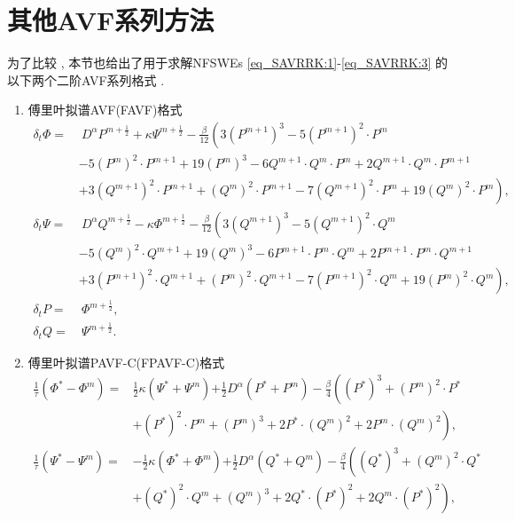 \section{其他AVF系列方法}\label{Section_PAVF: 3-1}
为了比较 , 本节也给出了用于求解NFSWEs \eqref{eq_SAVRRK:1}-\eqref{eq_SAVRRK:3} 的以下两个二阶AVF系列格式 . 
\begin{enumerate}[$\bullet$]
\item 傅里叶拟谱AVF(FAVF)格式
\begin{align}
\delta_{t} \varPhi =&~{D^{\alpha} P^{m+\frac{1}{2}}}+\kappa \Psi^{m+\frac{1}{2}}-\frac{\beta}{12}\left(3 (P^{m+1})^3-5 (P^{m+1})^2\cdot P^{m}\right . \nonumber\\
		&-5 (P^{m})^2\cdot P^{m+1}+19 (P^{m})^3-6 Q^{m+1}\cdot Q^{m}\cdot P^{m}+2 Q^{m+1}\cdot Q^{m}\cdot P^{m+1} \nonumber\\
		&+\left . 3 (Q^{m+1})^2\cdot P^{m+1}+(Q^{m})^2\cdot P^{m+1}-7 (Q^{m+1})^2\cdot P^{m}+19 (Q^{m} )^2\cdot P^{m}\right) , \label{eq_PAVF:66}\\
\delta_{t} \Psi =&~{D^{\alpha} Q^{m+\frac{1}{2}}}-\kappa \varPhi^{m+\frac{1}{2}}-\frac{\beta}{12}\left(3 (Q^{m+1})^3-5 (Q^{m+1})^2\cdot Q^{m}\right . \nonumber\\
		&-5 (Q^{m})^2\cdot Q^{m+1}+19 (Q^{m})^3-6 P^{m+1}\cdot P^{m}\cdot Q^{m}+2 P^{m+1}\cdot P^{m}\cdot Q^{m+1} \nonumber\\
		&+\left . 3 (P^{m+1})^2\cdot Q^{m+1}+(P^{m})^2\cdot Q^{m+1}-7 (P^{m+1})^2\cdot Q^{m}+19 (P^{m} )^2\cdot Q^{m}\right) , \label{eq_PAVF:67}\\
\delta_{t} P=&~\varPhi^{m+\frac{1}{2}} , \label{eq_PAVF:68}\\
\delta_{t} Q=&~\Psi^{m+\frac{1}{2}} . \label{eq_PAVF:69}
\end{align}
\item 傅里叶拟谱PAVF-C(FPAVF-C)格式
\begin{align}
\frac{1}{\tau}\left(\varPhi^{*}-\varPhi^{m}\right)=&\frac{1}{2}\kappa(\Psi^{*}+\Psi^{m}){+\frac{1}{2}D^{\alpha} (P^{*}+P^{m})}-\frac{\beta}{4}\left( (P^{*})^3+ (P^{m})^{2}\cdot P^{*}\right . \nonumber\\
		&\left . + (P^{*})^{2}\cdot P^{m}+ (P^{m})^{3}+2 P^{*}\cdot (Q^{m})^{2}+2 P^{m}\cdot (Q^{m})^{2}\right) , \label{eq_PAVF:90}\\
\frac{1}{\tau}\left(\Psi^{*}-\Psi^{m}\right)=&-\frac{1}{2}\kappa (\varPhi^{*}+\varPhi^{m}){+\frac{1}{2}D^{\alpha} (Q^{*}+Q^{m})}-\frac{\beta}{4}\left( (Q^{*})^3+ (Q^{m})^{2}\cdot Q^{*}\right . \nonumber\\
		&\left . + (Q^{*})^{2}\cdot Q^{m}+ (Q^{m})^{3}+2 Q^{*}\cdot (P^{*})^{2}+2 Q^{m}\cdot (P^{*})^{2}\right) , \label{eq_PAVF:91}\\

\end{align}
\end{enumerate}
